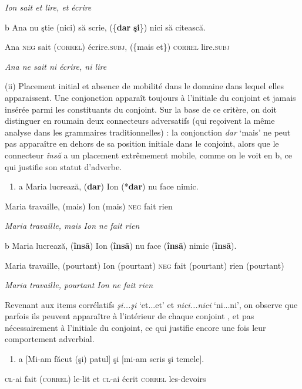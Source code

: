 {\itshape
Ion sait et lire, et écrire}

  b  Ana  nu  ştie  (nici)  să scrie,  (\{\textbf{dar}  {\textbar} \textbf{şi}\})  nici  să citească.

    Ana  \textsc{neg}  sait  (\textsc{correl)}  écrire.\textsc{subj},  (\{mais  {\textbar} et\})  \textsc{correl}  lire\textsc{.subj}

    \textit{Ana ne sait ni écrire, ni lire}

(ii) Placement initial et absence de mobilité dans le domaine dans lequel elles apparaissent. Une conjonction apparaît toujours à l'initiale du conjoint et jamais insérée parmi les constituants du conjoint. Sur la base de ce critère, on doit distinguer en roumain deux connecteurs adversatifs (qui reçoivent la même analyse dans les grammaires traditionnelles) : la conjonction \textit{dar} `mais' ne peut pas apparaître en dehors de sa position initiale dans le conjoint, alors que le connecteur \textit{însă} a un placement extrêmement mobile, comme on le voit en b, ce qui justifie son statut d'adverbe.


\begin{enumerate}
\item \label{bkm:Ref300167827}a  Maria  lucrează,  (\textbf{dar})  Ion  (*\textbf{dar})  nu  face  nimic.


\end{enumerate}
Maria  travaille,  (mais)  Ion  (mais)  \textsc{neg } fait  rien 

{\itshape
Maria travaille, mais Ion ne fait rien}

  b  Maria  lucrează,  (\textbf{însă})  Ion  (\textbf{însă})  nu  face  (\textbf{însă})  nimic  (\textbf{însă}).

    Maria  travaille,  (pourtant)  Ion  (pourtant)  \textsc{neg } fait  (pourtant)  rien  (pourtant)

    \textit{Maria travaille, pourtant Ion ne fait rien}

Revenant aux items corrélatifs \textit{şi...şi} `et...et' et \textit{nici...nici} `ni...ni', on observe que parfois ils peuvent apparaître à l'intérieur de chaque conjoint , et pas nécessairement à l'initiale du conjoint, ce qui justifie encore une fois leur comportement adverbial.


\begin{enumerate}
\item \label{bkm:Ref300305703}a  [Mi-am  făcut  (şi)  patul]  şi  [mi-am  scris  şi  temele].


\end{enumerate}
\textsc{cl}-ai  fait  (\textsc{correl) } le-lit  et  \textsc{cl}-ai  écrit  \textsc{correl } les-devoirs 

